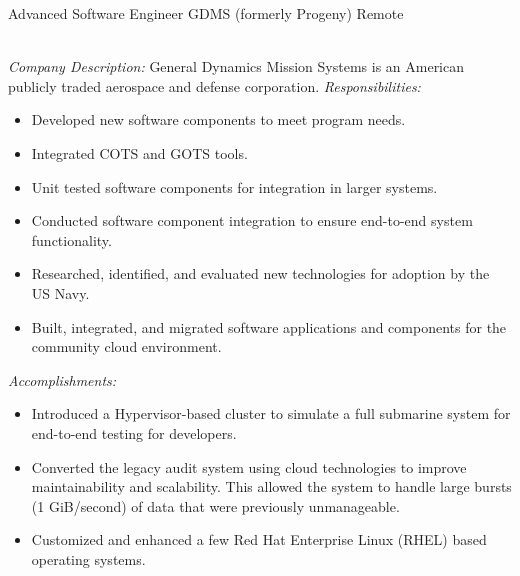 \begin{samepage}
	{Advanced Software Engineer}
	{GDMS (formerly Progeny)}
	{Remote}{} %
	{
		\emph{\\Company Description:}
		General Dynamics Mission Systems is an American publicly traded aerospace and
		defense corporation.
		\newline{}
		\newline{}
		\emph{Responsibilities:}
		\begin{itemize}
			\item Developed new software components to meet program needs.
			\item Integrated COTS and GOTS tools.
			\item Unit tested software components for integration in larger systems.
			\item Conducted software component integration to ensure end-to-end system functionality.
			\item Researched, identified, and evaluated new technologies for adoption by the US Navy.
			\item Built, integrated, and migrated software applications and components for the community cloud environment.\\
		\end{itemize}
		\emph{Accomplishments:}
		\begin{itemize}
			\item Introduced a Hypervisor-based cluster to simulate a full submarine system for end-to-end testing for developers.
			\item Converted the legacy audit system using cloud technologies to improve maintainability and scalability.
			      This allowed the system to handle large bursts (1 GiB/second) of data that were previously unmanageable.
			\item Customized and enhanced a few Red Hat Enterprise Linux (RHEL) based operating systems.\\
		\end{itemize}
	}
\end{samepage}
